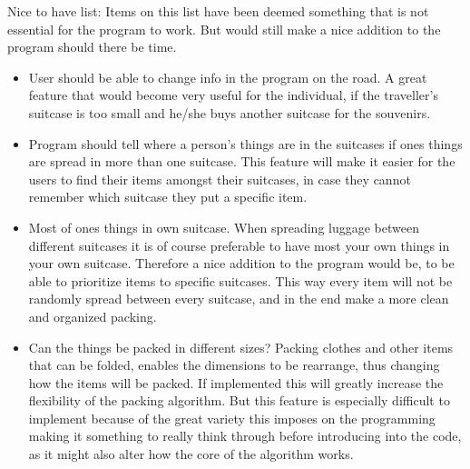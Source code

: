 Nice to have list:
Items on this list have been deemed something that is not essential for the program to work. But would still make a nice addition to the program should there be time.
\begin{itemize}
\item User should be able to change info in the program on the road.
A great feature that would become very useful for the individual, if the traveller's suitcase is too small and he/she buys another suitcase for the souvenirs. 

\item Program should tell where a person's things are in the suitcases if ones things are spread in more than one suitcase.
This feature will make it easier for the users to find their items amongst their suitcases, in case they cannot remember which suitcase they put a specific item.

\item Most of ones things in own suitcase.
When spreading luggage between different suitcases it is of course preferable to have most your own things in your own suitcase. Therefore a nice addition to the program would be, to be able to prioritize items to specific suitcases. This way every item will not be randomly spread between every suitcase, and in the end make a more clean and organized packing.

\item Can the things be packed in different sizes?
Packing clothes and other items that can be folded, enables the dimensions to be rearrange, thus changing how the items will be packed. If implemented this will greatly increase the flexibility of the packing algorithm. But this feature is especially difficult to implement because of the great variety this imposes on the programming making it something to really think through before introducing into the code, as it might also alter how the core of the algorithm works.
\end{itemize}